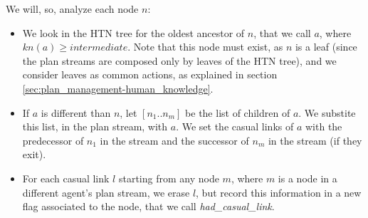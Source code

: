 We will, so, analyze each node $n$:
\begin{itemize}
\item We look in the HTN tree for the oldest ancestor of $n$, that we call $a$, where $kn(a) \geq intermediate$. Note that this node must exist, as $n$ is a leaf (since the plan streams are composed only by leaves of the HTN tree), and we consider leaves as common actions, as explained in section \ref{sec:plan_management-human_knowledge}.

\item If $a$ is different than $n$, let $[n_1..n_m]$ be the list of children of $a$. We substite this list, in the plan stream, with $a$. We set the casual links of $a$ with the predecessor of $n_1$ in the stream and the successor of $n_m$ in the stream (if they exit).
\item For each casual link $l$ starting from any node $m$, where $m$ is a node in a different agent's plan stream, we erase $l$, but record this information in a new flag associated to the node, that we call \textit{had\_casual\_link}.
\end{itemize}


